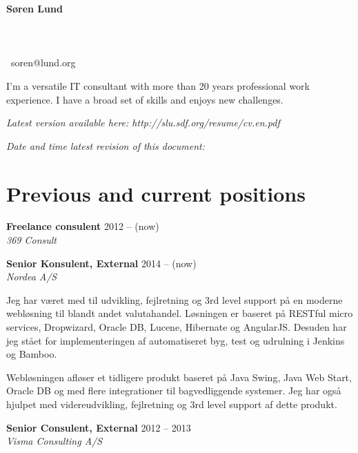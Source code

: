 \documentclass[a4paper,11pt]{article}
\newcommand\redacted{[skjult i online version]}
\newcommand\myaddressone{\redacted}
\newcommand\myaddresstwo{\redacted}
\newcommand\myphone{\redacted}
\begin{document}
\centerline{}
\bigskip

\begin{minipage}[b]{0.30\textwidth}
  \selectfont%
  \textbf{Søren Lund} \\
  \myaddressone \\
  \myaddresstwo \\
  \myphone \\
  \Email\ soren@lund.org
\end{minipage}%
\hfill
\begin{minipage}[b]{0.30\textwidth}
  \selectfont%
  I'm a versatile IT consultant with
  more than 20 years professional 
  work experience. I have a broad
  set of skills and enjoys new
  challenges.
\end{minipage}

\bigskip
\centerline{\small\textit{Latest version available here: http://slu.sdf.org/resume/cv.en.pdf}}
\centerline{\small\textit{Date and time latest revision of this document: }}

\section*{Previous and current positions}

\textbf{Freelance consulent} \hfill 2012 -- (now) \\
\textsl{369 Consult}

\smallskip

\textbf{Senior Konsulent, External} \hfill 2014 -- (now) \\
\textsl{Nordea A/S}

Jeg har været med til udvikling, fejlretning og 3rd level support på
en moderne webløsning til blandt andet valutahandel. Løsningen er
baseret på RESTful micro services, Dropwizard, Oracle DB, Lucene,
Hibernate og AngularJS. Desuden har jeg stået for implementeringen af
automatiseret byg, test og udrulning i Jenkins og Bamboo.

Webløsningen afløser et tidligere produkt baseret på Java Swing, Java
Web Start, Oracle DB og med flere integrationer til bagvedliggende
systemer. Jeg har også hjulpet med videreudvikling, fejlretning og 3rd
level support af dette produkt.

\smallskip

\textbf{Senior Consulent, External} \hfill 2012 -- 2013 \\
\textsl{Visma Consulting A/S}
\end{document}
